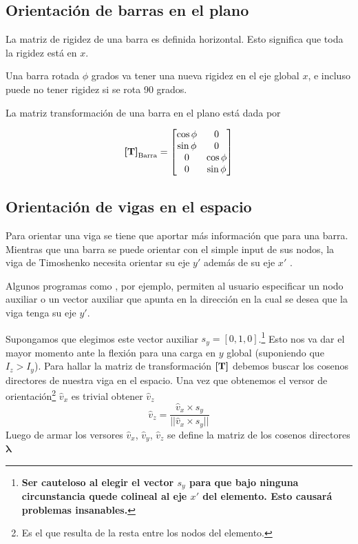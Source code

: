 \subsection*{Orientación de barras en el plano} \label{sec:OrientacionBarras}
La matriz de rigidez de una barra es definida horizontal. Esto significa que toda la rigidez está en $x$.

Una barra rotada $\phi$ grados va tener una nueva rigidez en el eje global $x$, e incluso puede no tener rigidez si se rota 90 grados.

La matriz transformación de una barra en el plano está dada por 

\[
\boldsymbol{[}\mathbf{T} \boldsymbol{]}_{\mathrm{Barra}}= \begin{bmatrix}
\cos \phi & 0 \\
\sin \phi & 0 \\
0 & \cos \phi \\
0 & \sin \phi
\end{bmatrix}
\]

\subsection*{Orientación de vigas en el espacio}
Para orientar una viga se tiene que aportar más información que para una barra. Mientras que una barra se puede orientar con el simple input de sus nodos, la viga de Timoshenko necesita orientar su eje $y'$ además de su eje $x'$ .

Algunos programas como \Adina, por ejemplo, permiten al usuario especificar un nodo auxiliar o un vector auxiliar que apunta en la dirección en la cual se desea que la viga tenga su eje $y'$. 

Supongamos que elegimos este vector auxiliar $s_y=[0,1,0]$.\footnote{\textbf{Ser cauteloso al elegir el vector $s_y$ para que bajo ninguna circunstancia quede colineal al eje $x'$ del elemento. Esto causará problemas insanables.}} Esto nos va dar el mayor momento ante la flexión para una carga en $y$ global (suponiendo que $I_z>I_y$).
 \newcommand{\versor}[1]{\hat{#1}}
Para hallar la matriz de transformación $\boldsymbol{[}\mathbf{T} \boldsymbol{]}$ debemos buscar los cosenos directores de nuestra viga en el espacio. Una vez que obtenemos el versor de orientación\footnote{Es el que resulta de la resta entre los nodos del elemento.} $\versor{v}_x$ es trivial obtener $\versor{v}_z$
\[
\versor{v}_z = \frac{\versor{v}_x\times s_y}{||\versor{v}_x\times s_y||}
\]
Luego de armar los versores $\versor{v}_x$, $\versor{v}_y$, $\versor{v}_z$ se define la matriz de los cosenos directores $\pmb{\lambda}$

